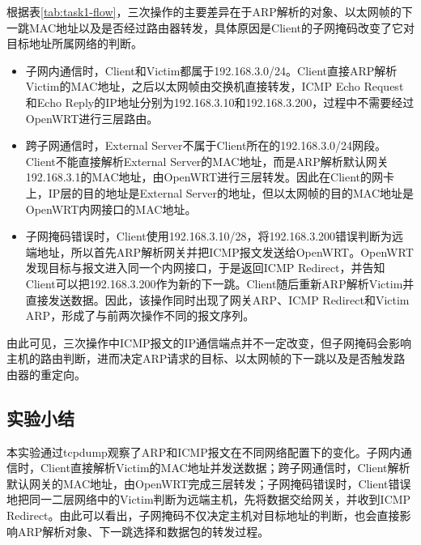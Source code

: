 根据表\ref{tab:task1-flow}，三次操作的主要差异在于ARP解析的对象、以太网帧的下一跳MAC地址以及是否经过路由器转发，具体原因是Client的子网掩码改变了它对目标地址所属网络的判断。

\begin{itemize}
    \item 子网内通信时，Client和Victim都属于192.168.3.0/24。Client直接ARP解析Victim的MAC地址，之后以太网帧由交换机直接转发，ICMP Echo Request和Echo Reply的IP地址分别为192.168.3.10和192.168.3.200，过程中不需要经过OpenWRT进行三层路由。
    \item 跨子网通信时，External Server不属于Client所在的192.168.3.0/24网段。Client不能直接解析External Server的MAC地址，而是ARP解析默认网关192.168.3.1的MAC地址，由OpenWRT进行三层转发。因此在Client的网卡上，IP层的目的地址是External Server的地址，但以太网帧的目的MAC地址是OpenWRT内网接口的MAC地址。
    \item 子网掩码错误时，Client使用192.168.3.10/28，将192.168.3.200错误判断为远端地址，所以首先ARP解析网关并把ICMP报文发送给OpenWRT。OpenWRT发现目标与报文进入同一个内网接口，于是返回ICMP Redirect，并告知Client可以把192.168.3.200作为新的下一跳。Client随后重新ARP解析Victim并直接发送数据。因此，该操作同时出现了网关ARP、ICMP Redirect和Victim ARP，形成了与前两次操作不同的报文序列。
\end{itemize}

由此可见，三次操作中ICMP报文的IP通信端点并不一定改变，但子网掩码会影响主机的路由判断，进而决定ARP请求的目标、以太网帧的下一跳以及是否触发路由器的重定向。

\subsection{实验小结}

本实验通过tcpdump观察了ARP和ICMP报文在不同网络配置下的变化。子网内通信时，Client直接解析Victim的MAC地址并发送数据；跨子网通信时，Client解析默认网关的MAC地址，由OpenWRT完成三层转发；子网掩码错误时，Client错误地把同一二层网络中的Victim判断为远端主机，先将数据交给网关，并收到ICMP Redirect。由此可以看出，子网掩码不仅决定主机对目标地址的判断，也会直接影响ARP解析对象、下一跳选择和数据包的转发过程。
